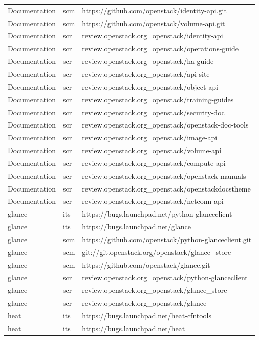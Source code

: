 \begin{center}
\begin{longtable}{|p{4cm}|p{1cm}|p{10cm}|}
Documentation&scm&https://github.com/openstack/identity-api.git\\ 
Documentation&scm&https://github.com/openstack/volume-api.git\\ 
Documentation&scr&review.openstack.org\_openstack/identity-api\\ 
Documentation&scr&review.openstack.org\_openstack/operations-guide\\ 
Documentation&scr&review.openstack.org\_openstack/ha-guide\\ 
Documentation&scr&review.openstack.org\_openstack/api-site\\ 
Documentation&scr&review.openstack.org\_openstack/object-api\\ 
Documentation&scr&review.openstack.org\_openstack/training-guides\\ 
Documentation&scr&review.openstack.org\_openstack/security-doc\\ 
Documentation&scr&review.openstack.org\_openstack/openstack-doc-tools\\ 
Documentation&scr&review.openstack.org\_openstack/image-api\\ 
Documentation&scr&review.openstack.org\_openstack/volume-api\\ 
Documentation&scr&review.openstack.org\_openstack/compute-api\\ 
Documentation&scr&review.openstack.org\_openstack/openstack-manuals\\ 
Documentation&scr&review.openstack.org\_openstack/openstackdocstheme\\ 
Documentation&scr&review.openstack.org\_openstack/netconn-api\\ 
glance&its&https://bugs.launchpad.net/python-glanceclient\\ 
glance&its&https://bugs.launchpad.net/glance\\ 
glance&scm&https://github.com/openstack/python-glanceclient.git\\ 
glance&scm&git://git.openstack.org/openstack/glance\_store\\ 
glance&scm&https://github.com/openstack/glance.git\\ 
glance&scr&review.openstack.org\_openstack/python-glanceclient\\ 
glance&scr&review.openstack.org\_openstack/glance\_store\\ 
glance&scr&review.openstack.org\_openstack/glance\\ 
heat&its&https://bugs.launchpad.net/heat-cfntools\\ 
heat&its&https://bugs.launchpad.net/heat\\ 

\end{longtable}
\end{center}
